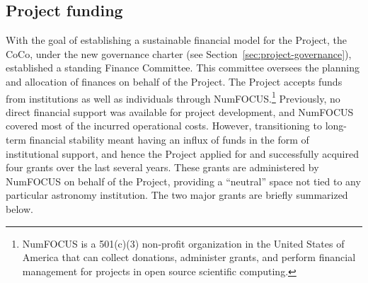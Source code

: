 \documentclass[modern]{aastex631}
\newcommand{\secauthor}[1]{{\color{blue}Author:~\textit{#1}}}
\begin{document}


\subsection{Project funding} \label{sec:project-funding}



With the goal of establishing a sustainable financial model for the \astropy
Project, the CoCo, under the new governance charter (see
Section~\ref{sec:project-governance}), established a standing Finance Committee.
This committee oversees the planning and allocation of finances on behalf
of the Project. The \astropy Project accepts funds from institutions as well as
individuals through NumFOCUS.\footnote{NumFOCUS is a 501(c)(3) non-profit
organization in the United States of America that can collect donations,
administer grants, and perform financial management for projects in open source
scientific computing.}
Previously, no direct financial support was available for project development,
and NumFOCUS covered most of the incurred operational costs. However, transitioning
to long-term financial stability meant having an influx of funds in the form of
institutional support, and hence the \astropy Project applied for and successfully
acquired four grants over the last several years. These grants are administered by NumFOCUS on behalf of the
Project, providing a ``neutral'' space not tied to any particular astronomy
institution. The two major grants are briefly summarized below.
\end{document}
